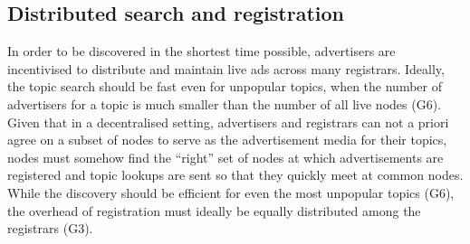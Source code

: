 \subsection{Distributed search and registration}

In order to be discovered in the shortest time possible, advertisers are incentivised to distribute and maintain live ads across many registrars. Ideally, the topic search should be fast even for unpopular topics, \ie when the number of advertisers for a topic is much smaller than the number of all live nodes (G6). 
Given that in a decentralised setting, advertisers and registrars can not a priori agree on a subset of nodes to serve as the advertisement media for their topics, nodes must somehow find the ``right'' set of nodes at which advertisements are registered and topic lookups are sent so that they quickly meet at common nodes. While the discovery should be efficient for even the most unpopular topics (G6), the overhead of registration must ideally be equally distributed among the registrars (G3).


